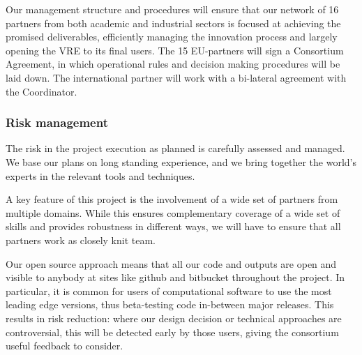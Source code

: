 Our management structure and procedures will ensure that our network
of  16 partners from both academic and industrial sectors is focused at
achieving the promised deliverables, efficiently managing the
innovation process and largely opening the VRE to its final users. The
 15 EU-partners will sign a Consortium Agreement, in which operational
rules and decision making procedures will be laid down. The
international partner will work with a bi-lateral agreement with the
Coordinator.







\subsubsection{Risk management}

The risk in the project execution as planned is carefully assessed and
managed. We base our plans on long standing experience, and we bring
together the world's experts in the relevant tools and techniques.

A key feature of this project is the involvement of a wide set of
partners from multiple domains. While this ensures complementary
coverage of a wide set of skills and provides robustness in different
ways, we will have to ensure that all partners work as closely knit
team. 

Our open source approach means that all our code and outputs
are open and visible to anybody at sites like github and bitbucket
throughout the project. In particular, it is common for users of
computational software to use the most leading edge versions, thus
beta-testing code in-between major releases. This results in risk
reduction: where our design decision or technical approaches are
controversial, this will be detected early by those users, giving the
consortium useful feedback to consider.

